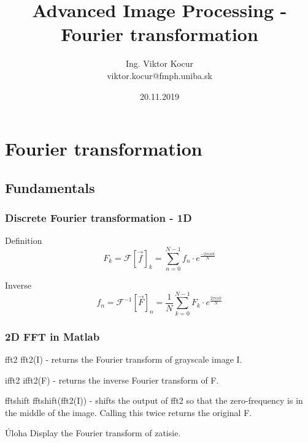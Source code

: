 \documentclass{beamer}
\title[9. cvičenie]{Advanced Image Processing - Fourier transformation}
\author[Kocur]{Ing. Viktor Kocur \\{\small viktor.kocur@fmph.uniba.sk}}
\institute{DAI FMFI UK}
\date{20.11.2019}
\begin{document}


\begin{frame}

  \titlepage

\end{frame}

\section{Fourier transformation}

\subsection{Fundamentals}

\begin{frame}
\frametitle{Discrete Fourier transformation - 1D} 
  \begin{block}{Definition}    
    $$F_k = \mathscr{F}[ \vec{f}]_k = \sum_{n = 0}^{N - 1} f_n \cdot e^{\frac{-2 \pi i n k}{N}}$$
  \end{block}

  \begin{block}{Inverse}
    $$f_n = \mathscr{F}^{-1}[\vec{F}]_n = \frac{1}{N} \sum_{k = 0}^{N - 1} F_k \cdot e^{\frac{2 \pi i n k}{N}}$$
  \end{block}

\end{frame}

\begin{frame}
\frametitle{2D FFT in Matlab} 

\begin{block}{fft2}
fft2(I) - returns the Fourier transform of grayscale image I.
\end{block}

\begin{block}{ifft2}
ifft2(F) - returns the inverse Fourier transform of F.
\end{block}

\begin{block}{fftshift}
fftshift(fft2(I)) - shifts the output of fft2 so that the zero-frequency is in the middle of the image. Calling this twice returns the original F.
\end{block}

\begin{block}{Úloha}
Display the Fourier transform of zatisie.
\end{block}

\end{frame}
\end{document}
